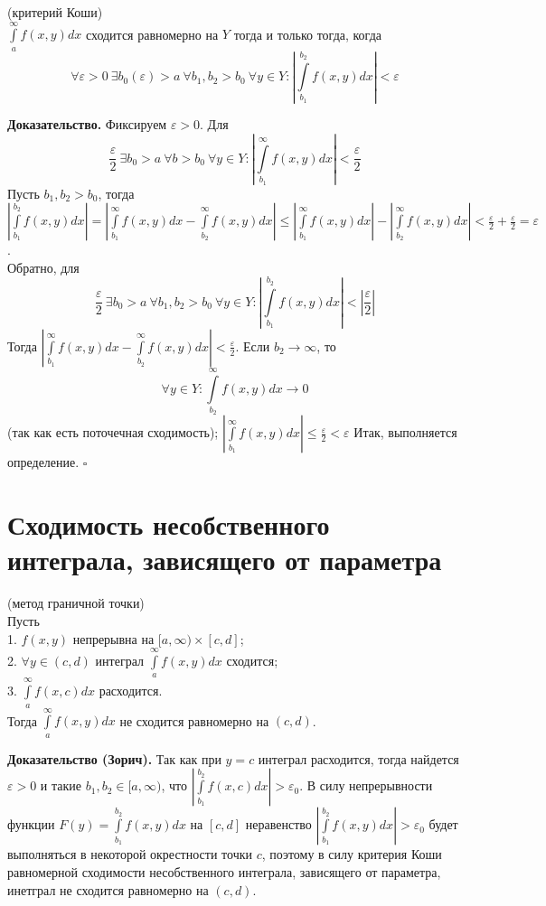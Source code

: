 \begin{theor}(критерий Коши)\\
    $\int\limits_{a}^{\infty}f(x,y)dx$ сходится равномерно на $Y$ тогда и 
    только тогда, когда 
     $$\forall \varepsilon>0~\exists b_0(\varepsilon)>a~\forall b_1,b_2>b_0~
 \forall y\in Y:\left|\int\limits_{b_1}^{b_2}f(x,y)dx\right|<\varepsilon$$
\end{theor}
\textbf{Доказательство.}  Фиксируем $\varepsilon>0$. Для 
$$\frac{\varepsilon}{2}~\exists b_0>a~\forall b>b_0~\forall y\in Y:
\left|\int\limits_{b_1}^{\infty}f(x,y)dx\right|<
\frac{\varepsilon}{2}$$
Пусть $b_1,b_2>b_0$, тогда $\left| \int\limits_{b_1}^{b_2}f(x,y)dx\right|=
\left|\int\limits_{b_1}^{\infty}f(x,y)dx-\int\limits_{b_2}^{\infty} f(x,y)dx
\right|\leqslant 
\left|\int\limits_{b_1}^{\infty}f(x,y)dx\right|
-\left|\int\limits_{b_2}^{\infty} f(x,y)dx\right|<
\frac{\varepsilon}{2}+\frac{\varepsilon}{2}=\varepsilon$.\\
Обратно, для
$$\frac{\varepsilon}{2}~\exists b_0>a~\forall b_1,b_2>b_0~\forall y\in Y:
\left|\int\limits_{b_1}^{b_2}f(x,y)dx\right|<
\left|\frac{\varepsilon}{2}\right|$$
Тогда 
$\left|\int\limits_{b_1}^{\infty}f(x,y)dx-\int\limits_{b_2}^{\infty} f(x,y)dx
\right|<\frac{\varepsilon}{2}$. Если $b_2\to \infty$, то
$$\forall y\in Y: \int\limits_{b_2}^{\infty}f(x,y)dx\to 0$$ 
(так как есть поточечная сходимость);
$\left|\int\limits_{b_1}^{\infty}f(x,y)dx\right|\leqslant\frac{\varepsilon}{2}
<\varepsilon$
Итак, выполняется определение. $\square$ \\
\section{Сходимость несобственного интеграла, зависящего от параметра}
\begin{theor}
    (метод граничной точки)\\
    Пусть\\
    1. $f(x,y)$ непрерывна на $[a,\infty)\times[c,d]$;\\
    2. $\forall y\in (c,d)$ интеграл $\int\limits_{a}^{\infty} f(x,y)dx$ 
    сходится; \\
    3. $\int\limits_{a}^{\infty}f(x,c)dx$ расходится.\\
    Тогда $\int\limits_{a}^{\infty}f(x,y)dx$ не сходится равномерно на 
    $(c,d)$.
\end{theor}
\textbf{Доказательство (Зорич).} Так как при $y=c$ интеграл расходится, тогда
найдется $\varepsilon>0$ и такие $b_1,b_2\in [a,\infty)$, что
$\left| \int\limits_{b_1}^{b_2} f(x,c)dx \right|>\varepsilon_0$. В силу 
непрерывности функции $F(y)=\int\limits_{b_1}^{b_2} f(x,y)dx$ на $[c,d]$ 
неравенство $\left| \int\limits_{b_1}^{b_2} f(x,y)dx \right|>\varepsilon_0$
будет выполняться в некоторой окрестности точки $c$, поэтому в силу 
критерия Коши равномерной сходимости несобственного интеграла, зависящего от
параметра, инетграл не сходится равномерно на $(c,d)$. 

